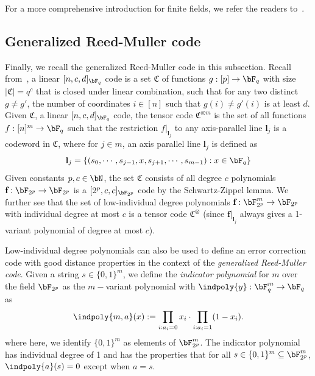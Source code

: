 For a more comprehensive introduction for finite fields, we refer the readers to~\cite{mullenHandbookFiniteFields2013}. 

\subsection{Generalized Reed-Muller code } \label{sec:RMcode}
Finally, we recall the generalized Reed-Muller code in this subsection. Recall from~\cite{jiQuantumSoundnessTesting2022}, a linear $[n, c, d]_{\bF_{q}}$ code is a set $\mathfrak{C}$ of functions $g: [p] \rightarrow \bF_{q}$ with size $|\mathfrak{C}| = q^c$ that is closed under linear combination, such that for any two distinct $g \neq g'$, the number of coordinates $i \in [n]$ such that $g(i) \neq g'(i)$ is at least $d$. Given $\mathfrak{C}$, a linear $[n, c, d]_{\bF_{q}}$ code, the tensor code $\mathfrak{C}^{\otimes m}$ is the set of all functions $f:[n]^m \rightarrow \bF_{q}$ such that the restriction $f|_{\textbf{l}_j}$ to any axis-parallel line $\textbf{l}_j$ is a codeword in $\mathfrak{C}$, where for $j \in m$, an axis parallel line $\textbf{l}_j$ is defined as
\begin{equation*}
	\textbf{l}_j = \{(s_0, \cdots, s_{j-1}, x, s_{j+1}, \cdots, s_{m-1}): x \in \bF_{q}\}
\end{equation*}
Given constants $p, c \in \bN$, the set $\mathfrak{C}$ consists of all degree $c$ polynomials $\textbf{f}: \bF_{2^p} \rightarrow \bF_{2^p}$ is a $[2^p, c, c]_{\bF_{2^p}}$ code by the Schwartz-Zippel lemma. We further see that the set of low-individual degree polynomials $\textbf{f}: \bF_{2^p}^m \rightarrow \bF_{2^p}$ with individual degree at most $c$ is a tensor code $\mathfrak{C}^{\otimes}$ (since $\textbf{f}|_{\textbf{l}_j}$ always gives a 1-variant polynomial of degree at most $c$). 

Low-individual degree polynomials can also be used to define an error correction code with good distance properties in the context of the \textit{generalized Reed-Muller code}. Given a string $s \in \{0,1\}^m$, we define the \textit{indicator polynomial} for $m$ over the field $\bF_{2^p}$ as the $m-$variant polynomial with $\indpoly{y}: \bF_q^m \rightarrow \bF_q$ as
\begin{equation*}
	\indpoly{m,a}(x) := \prod_{i: a_i = 0} x_i \cdot \prod_{i: a_i = 1} (1 - x_i).
\end{equation*} 
where here, we identify $\{0,1\}^m$ as elements of $\bF_{2^p}^m$. The indicator polynomial has individual degree of 1 and has the properties that for all $s \in \{0,1\}^m \subseteq \bF_{2^p}^m$, $\indpoly{a}(s) = 0$ except when $a = s$. 

